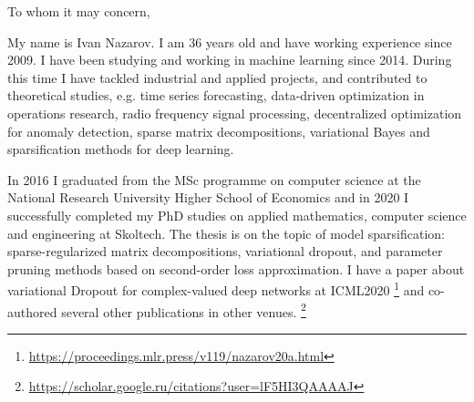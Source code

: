 \documentclass[14pt]{letter}
\begin{document}
\thispagestyle{empty}

%

\vspace{1.5cm}

\begin{minipage}{0.5\linewidth}
To whom it may concern, \par
\end{minipage} \par\bigskip

My name is Ivan Nazarov. I am {36} years old and have working experience since 2009.
I have been studying and working in machine learning since 2014. During this time I
have tackled industrial and applied projects, and contributed to theoretical studies,
e.g. time series forecasting, data-driven optimization in operations research, radio
frequency signal processing, decentralized optimization for anomaly detection, sparse
matrix decompositions, variational Bayes and sparsification methods for deep learning.
\par\medskip

In 2016 I graduated from the MSc programme on computer science at the National Research
University Higher School of Economics and in 2020 I successfully completed my PhD studies
on applied mathematics, computer science and engineering at Skoltech. The thesis is on
the topic of model sparsification: sparse-regularized matrix decompositions, variational
dropout, and parameter pruning methods based on second-order loss approximation. I have
a paper about variational Dropout for complex-valued deep networks at ICML2020%
\footnote{
    \url{https://proceedings.mlr.press/v119/nazarov20a.html}
} and co-authored several other publications in other venues.%
\footnote{
    \url{https://scholar.google.ru/citations?user=lF5HI3QAAAAJ}
}
\par\medskip
\end{document}

